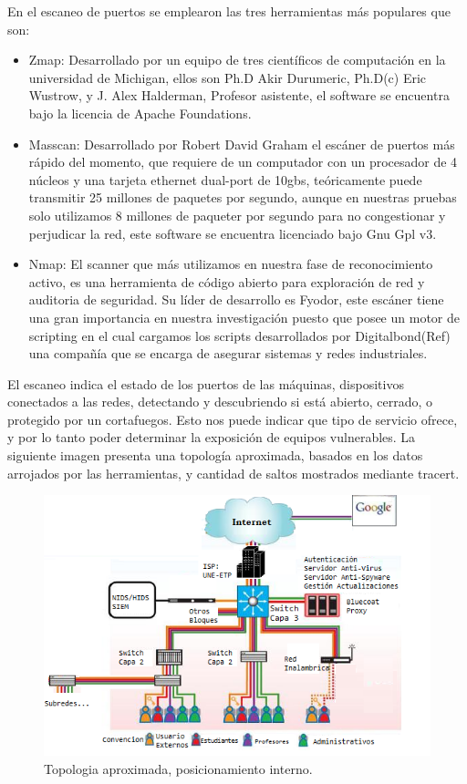 \documentclass[jou,apacite]{apa6}   %
\begin{document}
En el escaneo de puertos se emplearon las tres herramientas más populares que son:
\begin{itemize}
\item Zmap: Desarrollado por un equipo de tres científicos de computación en la universidad de Michigan, ellos son Ph.D  Akir Durumeric, Ph.D(c) Eric Wustrow, y J. Alex Halderman, Profesor asistente, el software se encuentra bajo la licencia de Apache Foundations.
\item Masscan: Desarrollado por Robert David Graham el escáner de puertos más rápido del momento, que requiere de un computador con un procesador de 4 núcleos y una tarjeta ethernet dual-port de 10gbs, teóricamente puede transmitir 25 millones de paquetes por segundo, aunque en nuestras pruebas solo utilizamos 8 millones de paqueter por segundo para no congestionar y perjudicar la red, este software se encuentra licenciado bajo Gnu Gpl v3.
\item Nmap: El scanner que más utilizamos en nuestra fase de reconocimiento activo,  es una herramienta de código abierto para exploración de red y auditoria de seguridad. Su líder de desarrollo es Fyodor, este escáner tiene una gran importancia en nuestra investigación puesto que posee un motor de scripting en el cual cargamos los scripts desarrollados por Digitalbond(Ref) una compañía que se encarga de asegurar sistemas y redes industriales.
\end{itemize}
El escaneo indica el estado de los puertos de las máquinas, dispositivos conectados a las redes, detectando y descubriendo si está abierto, cerrado, o protegido por un  cortafuegos. Esto nos puede indicar que tipo de servicio ofrece, y por lo tanto poder determinar la exposición de equipos vulnerables. La siguiente imagen presenta una topología aproximada, basados en los datos arrojados por las herramientas, y cantidad de saltos mostrados mediante tracert.
\begin{figure}[htb]
\centering
\includegraphics[scale=0.6]{images/topologia.png}
\caption{Topologia aproximada, posicionamiento interno.} \label{fig:topologiared}
\end{figure}
\end{document}
